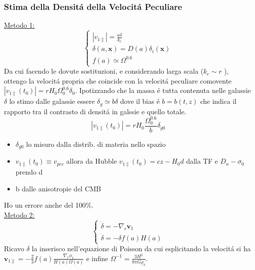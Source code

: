 \documentclass[12pt, a4paper]{article}
\begin{document}
\subsubsection{Stima della Densit\'{a} della Velocit\'{a} Peculiare}
\underline{Metodo 1:}
\begin{equation}
\begin{cases}
\left|v_{1\parallel}\right|=\frac{a\dot{\delta}}{k_c}
\\
\delta(a, \textbf{x})=D(a) \delta_i(\textbf{x})
\\
f(a)\simeq \Omega^{0.6}
\end{cases}
\end{equation}
Da cui facendo le dovute sostituzioni, e considerando larga scala ($k_c\sim r$ ), ottengo la velocit\'{a} propria che coincide con la velocit\'{a} peculiare comovente $\left|v_{1\parallel}(t_0)\right|=r H_0\Omega_0^{0.6}\delta_0$. Ipotizzando che la massa \'{e} tutta contenuta nelle galassie $\delta$ lo stimo dalle galassie essere $\delta_g\simeq
b\delta$ dove il bias \'{e} $b=b(t,z)$ che indica il rapporto tra il contrasto di densit\'{a} in galssie e quello totale.
\begin{equation}
\left|v_{1\parallel}(t_0)\right|=r H_0\frac{\Omega_0^{0.6}}{b}\delta_{g0}
\end{equation}
\begin{itemize}
\item $\delta_{g0}$ lo misuro dalla distrib. di materia nello spazio
\item $v_{1\parallel}(t_0) \equiv v_{pec}$ allora da Hubble  $v_{1\parallel}(t_0)=cz- H_0 d$ dalla TF e $D_n -\sigma_0$ prendo d
\item b dalle anisotropie del CMB 
\end{itemize}
Ho un errore anche del 100\%.\\
\underline{Metodo 2:}
\begin{equation}
\begin{cases}
\dot{\delta}=-\nabla_r\textbf{v}_1
\\
\dot{\delta}=-\delta f(a)H(a)
\end{cases}
\end{equation}
Ricavo $\delta$ la inserisco nell'equazione di Poisson da cui esplicitando la velocit\'{a} si ha $\textbf{v}_{1\parallel}=-\frac{2}{3}f(a)\frac{\nabla_r \phi_1}{H(a)\Omega(a)}$  e infine $\Omega^{-1}=\frac{3H^2}{8\pi G\rho_b}$.
\end{document}
